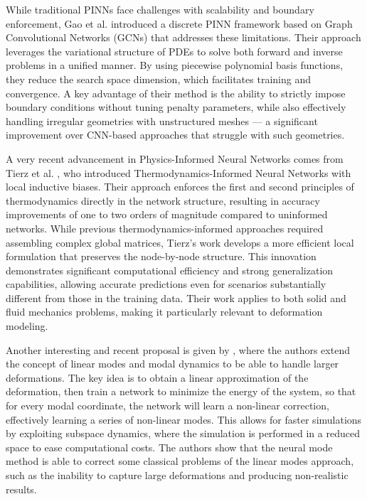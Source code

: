 While traditional PINNs face challenges with scalability and boundary enforcement, Gao et al. \cite{gaoPhysicsinformedGraphNeural2022} introduced a discrete PINN framework based on Graph Convolutional Networks (GCNs) that addresses these limitations. Their approach leverages the variational structure of PDEs to solve both forward and inverse problems in a unified manner. By using piecewise polynomial basis functions, they reduce the search space dimension, which facilitates training and convergence. A key advantage of their method is the ability to strictly impose boundary conditions without tuning penalty parameters, while also effectively handling irregular geometries with unstructured meshes — a significant improvement over CNN-based approaches that struggle with such geometries.

A very recent advancement in Physics-Informed Neural Networks comes from Tierz et al. \cite{Tierz_Alfaro_González_Chinesta_Cueto_2025}, who introduced Thermodynamics-Informed Neural Networks with local inductive biases. Their approach enforces the first and second principles of thermodynamics directly in the network structure, resulting in accuracy improvements of one to two orders of magnitude compared to uninformed networks. While previous thermodynamics-informed approaches required assembling complex global matrices, Tierz's work develops a more efficient local formulation that preserves the node-by-node structure. This innovation demonstrates significant computational efficiency and strong generalization capabilities, allowing accurate predictions even for scenarios substantially different from those in the training data. Their work applies to both solid and fluid mechanics problems, making it particularly relevant to deformation modeling.

Another interesting and recent proposal is given by \cite{Wang_Du_Coros_Thomaszewski_2024}, where the authors extend the concept of linear modes and modal dynamics \cite{Pentland_Williams_1989} to be able to handle larger deformations. The key idea is to obtain a linear approximation of the deformation, then train a network to minimize the energy of the system, so that for every modal coordinate, the network will learn a non-linear correction, effectively learning a series of non-linear modes. This allows for faster simulations by exploiting subspace dynamics, where the simulation is performed in a reduced space to ease computational costs. The authors show that the neural mode method is able to correct some classical problems of the linear modes approach, such as the inability to capture large deformations and producing non-realistic results. 

